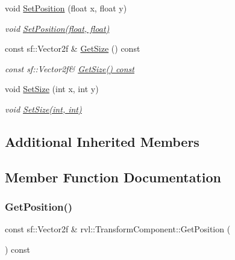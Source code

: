 \begin{DoxyCompactItemize}
void \hyperlink{classrvl_1_1_transform_component_aba3ab6e758c936277401e19543d50d06}{Set\+Position} (float x, float y)
\begin{DoxyCompactList}\small\item\em void \hyperlink{classrvl_1_1_transform_component_aba3ab6e758c936277401e19543d50d06}{Set\+Position(float, float)} \end{DoxyCompactList}\item 
const sf\+::\+Vector2f \& \hyperlink{classrvl_1_1_transform_component_a9f700dd8b95b804157d6c25357959f96}{Get\+Size} () const
\begin{DoxyCompactList}\small\item\em const sf\+::\+Vector2f\& \hyperlink{classrvl_1_1_transform_component_a9f700dd8b95b804157d6c25357959f96}{Get\+Size() const} \end{DoxyCompactList}\item 
void \hyperlink{classrvl_1_1_transform_component_a5f68c11c50a2d0b9d2121047dec90311}{Set\+Size} (int x, int y)
\begin{DoxyCompactList}\small\item\em void \hyperlink{classrvl_1_1_transform_component_a5f68c11c50a2d0b9d2121047dec90311}{Set\+Size(int, int)} \end{DoxyCompactList}\end{DoxyCompactItemize}
\subsection*{Additional Inherited Members}


\subsection{Member Function Documentation}
\mbox{\label{classrvl_1_1_transform_component_aafd23354a3e3b214569cdb6eedbf0dc1}} 
\subsubsection{\texorpdfstring{Get\+Position()}{GetPosition()}}
{\footnotesize\ttfamily const sf\+::\+Vector2f \& rvl\+::\+Transform\+Component\+::\+Get\+Position (\begin{DoxyParamCaption}{ }\end{DoxyParamCaption}) const}



